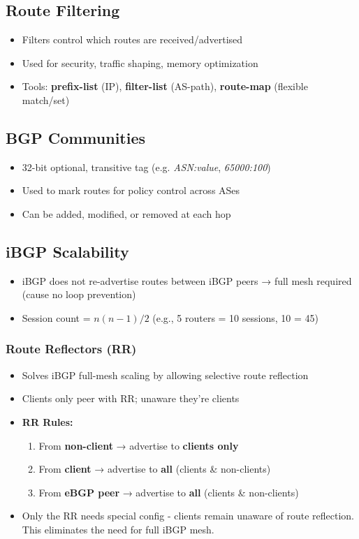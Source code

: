 \begin{multicols*}{5}
		\subsection{Route Filtering}
		\begin{itemize}
			\item Filters control which routes are received/advertised
			\item Used for security, traffic shaping, memory optimization
			\item Tools: \textbf{prefix-list} (IP), \textbf{filter-list} (AS-path), \textbf{route-map} (flexible match/set)
		\end{itemize}
		
		\subsection{BGP Communities}
		\begin{itemize}
			\item 32-bit optional, transitive tag (e.g. \textit{ASN:value}, \textit{65000:100})
			\item Used to mark routes for policy control across ASes
			\item Can be added, modified, or removed at each hop
		\end{itemize}
		
		\subsection{iBGP Scalability}
		\begin{itemize}
			\item iBGP does not re-advertise routes between iBGP peers → full mesh required (cause no loop prevention)
			\item Session count = $n(n{-}1)/2$ (e.g., 5 routers = 10 sessions, 10 = 45)
		\end{itemize}
		
		\subsubsection*{Route Reflectors (RR)}
		\begin{itemize}
			\item Solves iBGP full-mesh scaling by allowing selective route reflection
			\item Clients only peer with RR; unaware they’re clients
			\item \textbf{RR Rules:}
			\begin{enumerate}
				\item From \textbf{non-client} → advertise to \textbf{clients only}
				\item From \textbf{client} → advertise to \textbf{all} (clients \& non-clients)
				\item From \textbf{eBGP peer} → advertise to \textbf{all} (clients \& non-clients)
			\end{enumerate}
			\item Only the RR needs special config - clients remain unaware of route reflection. This eliminates the need for full iBGP mesh.
		\end{itemize}
		

\end{multicols*}
